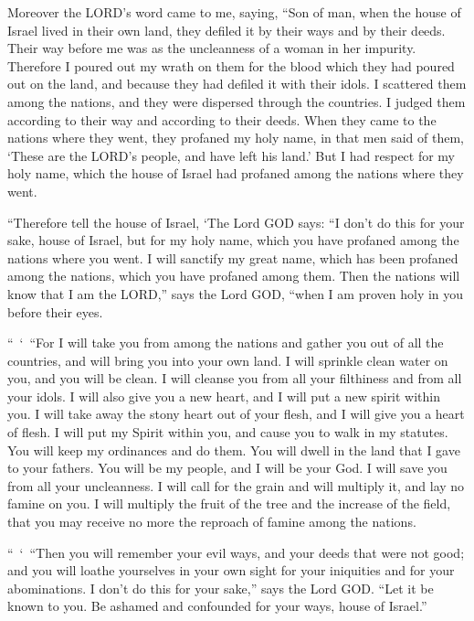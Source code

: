 \myverse{}Moreover the LORD’s word came to me, saying,
\myverse{}“Son of man, when the house of Israel lived in their own land, they defiled
it by their ways and by their deeds. Their way before me was as the uncleanness of a woman in her impurity.
\myverse{}Therefore I poured out my wrath on them for the blood which they had poured
out on the land, and because they had defiled it with their idols.
\myverse{}I scattered them among the nations, and they were dispersed through the countries.
I judged them according to their way and according to their deeds.
\myverse{}When they came to the nations where they went, they profaned my holy name,
in that men said of them, ‘These are the LORD’s people, and have left his land.’
\myverse{}But I had respect for my holy name, which the house of Israel had profaned
among the nations where they went.

\myverse{}“Therefore tell the house of Israel, ‘The Lord GOD says: “I
don’t do this for your sake, house of Israel, but for my holy name, which you have profaned among the
nations where you went.
\myverse{}I will sanctify my great name, which has been profaned among the nations,
which you have profaned among them. Then the nations will know that I am the LORD,” says the Lord GOD,
“when I am proven holy in you before their eyes.

\myverse{}“ ‘ “For I will take you from among the nations and gather you
out of all the countries, and will bring you into your own land.
\myverse{}I will sprinkle clean water on you, and you will be clean. I will cleanse
you from all your filthiness and from all your idols.
\myverse{}I will also give you a new heart, and I will put a new spirit within you.
I will take away the stony heart out of your flesh, and I will give you a heart of flesh.
\myverse{}I will put my Spirit within you, and cause you to walk in my statutes. You
will keep my ordinances and do them.
\myverse{}You will dwell in the land that I gave to your fathers. You will be my people,
and I will be your God.
\myverse{}I will save you from all your uncleanness. I will call for the grain and
will multiply it, and lay no famine on you.
\myverse{}I will multiply the fruit of the tree and the increase of the field, that
you may receive no more the reproach of famine among the nations.

\myverse{}“ ‘ “Then you will remember your evil ways, and your deeds that
were not good; and you will loathe yourselves in your own sight for your iniquities and for your abominations.
\myverse{}I don’t do this for your sake,” says the Lord GOD. “Let it be known to you.
Be ashamed and confounded for your ways, house of Israel.”

